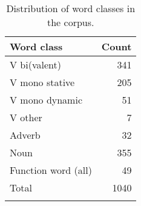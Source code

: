 \begin{table}
\caption{Distribution of word classes in the corpus.}
\label{tab47}
\begin{tabularx}{0.5\textwidth}{p{4cm}r}
 \lsptoprule
 Word class & Count\\
 \midrule
 V bi(valent) & 341\\
 V mono stative & 205\\
 V mono dynamic & 51\\
 V other & 7\\
 Adverb & 32\\
 Noun & 355\\
 Function word (all) & 49\\
 \midrule
 Total & 1040\\
\lspbottomrule
\end{tabularx}
\end{table}


